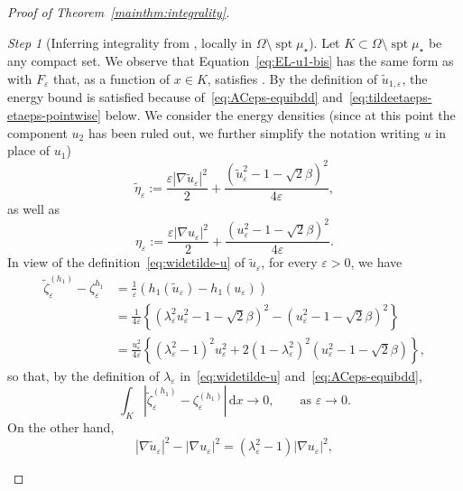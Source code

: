 \documentclass[a4paper, 11pt, twoside, leqno]{article}
\theoremstyle{definition}              %
\theoremstyle{remark}                  %
\newtheorem{step}{Step}
\DeclareMathOperator{\spt}{spt}                                     %
\newcommand{\abs}[1]{\left| #1 \right|}                             %
\renewcommand{\d}{\mathrm{d}}
\newcommand{\eps}{\varepsilon}
\begin{document}
\begin{proof}[{Proof of Theorem~\ref{mainthm:integrality}}]
	\begin{step}[Inferring integrality from \cite{NagaseTonegawa}, locally in $\Omega \setminus \spt\mu_\star$]
	Let $K \subset \Omega \setminus \spt \mu_\star$ be any compact set. 
	We observe that Equation~\eqref{eq:EL-u1-bis} has the same form 
	as \cite[Equation~(1.2)]{NagaseTonegawa} with $F_\eps$ that, as a function 
	of $x \in K$, satisfies \cite[Assumption~(A.2)]{NagaseTonegawa}. 
	By the definition of $\widetilde{u}_{1,\eps}$, the energy 
	bound \cite[(A.1)]{NagaseTonegawa} is satisfied because 
	of~\eqref{eq:ACeps-equibdd} and~\eqref{eq:tildeetaeps-etaeps-pointwise} below.   
	We consider the energy densities 
	(since at this point the component $u_2$ has been ruled out, we further 
	simplify the notation writing $u$ in place of $u_1$)
	\[
		\widetilde{\eta}_\eps := 
		\frac{\eps\abs{\nabla \widetilde{u}_{\eps}}^2}{2} 
		+ \frac{\left(\widetilde{u}_\eps^2-1-\sqrt{2}\beta\right)^2}{4 \eps},  
	\]
	as well as 
	\[
		\eta_\eps := \frac{\eps\abs{\nabla u_{\eps}}^2}{2} 
		+ \frac{\left(u_\eps^2-1-\sqrt{2}\beta\right)^2}{4 \eps}.
	\]
	In view of the definition~\eqref{eq:widetilde-u} of $\widetilde{u}_\eps$, 
	for every $\eps > 0$, we have 
	\begin{equation}\label{eq:tilde-zeta-h1-eps-zeta-h1-eps}
	\begin{split}
		\widetilde{\zeta}^{(h_1)}_\eps - \zeta^{h_1}_\eps &= 
		\frac{1}{\eps}( h_1(\widetilde{u}_\eps) - h_1(u_\eps) ) \\
		&= \frac{1}{4\eps} \left\{ \left(\lambda_\eps^2 u^2_\eps - 1 - \sqrt{2}\beta \right)^2 - \left(u^2_\eps - 1 - \sqrt{2}\beta \right)^2 \right\} \\
		&= \frac{u_\eps^2}{4\eps}\left\{ \left(\lambda_\eps^2 - 1\right)^2 u_\eps^2 + 2\left(1-\lambda_\eps^2\right)^2 \left(u_\eps^2-1-\sqrt{2}\beta\right)  \right\},
	\end{split}
	\end{equation}
	so that, by the definition of $\lambda_\eps$ in~\eqref{eq:widetilde-u} 
	and~\eqref{eq:ACeps-equibdd},
	\begin{equation}\label{eq:tilde-zeta-h1-eps-zeta-h1-eps-limit}
		\int_K \abs{\widetilde{\zeta}^{(h_1)}_\eps - \zeta^{(h_1)}_\eps}\,{\d}x 
		\to 0, \qquad \mbox{as } \eps \to 0.
	\end{equation}
	On the other hand, 
	\begin{equation}\label{eq:tilde-nabla-u-nabla-u}
		\abs{\nabla \widetilde{u}_\eps}^2 - \abs{\nabla u_\eps}^2 
		= \left( \lambda_\eps^2 - 1 \right) \abs{\nabla u_\eps}^2,
	\end{equation}

\end{step}
\end{proof}
\end{document}
